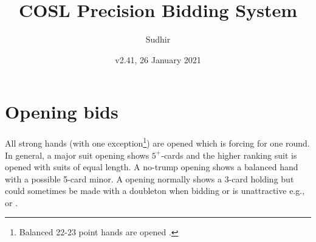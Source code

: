 \documentclass[a4paper,article,oneside]{memoir}
\begin{document}
\title{COSL Precision Bidding System}
\author{Sudhir}
\date{v2.41, 26 January 2021}
\maketitle

\tableofcontents

\pagebreak

\section{Opening bids}

All strong hands (with one exception\footnote{Balanced 22-23
  point hands are opened .}) are opened  which is forcing
for one round. In general, a major suit opening shows $5^+$-cards and
the higher ranking suit is opened with suits of equal length. A
no-trump opening shows a balanced hand with a possible 5-card minor. A
 opening normally shows a 3-card holding but could sometimes be
made with a doubleton when bidding  or  is unattractive
e.g.,  or .
\end{document}
